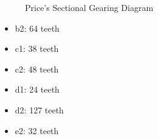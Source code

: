 \documentclass[11pt, oneside]{article}   	%
\theoremstyle{definition}
\begin{document}
\bigskip
\begin{figure}[H]
  \caption{Price's Sectional Gearing Diagram \cite{gears_from_the_greeks}}
  \label{fig:sectional_gearing}
\end{figure}
\bigskip
\bigskip
\bigskip
\begin{minipage}[c]{0.45\textwidth}
  \begin{itemize}
    \item b2: 64 teeth
    \item c1: 38 teeth
    \item c2: 48 teeth
    \item d1: 24 teeth
    \item d2: 127 teeth
    \item e2: 32 teeth
  \end{itemize}
\end{minipage}
\hfill
\end{document}
